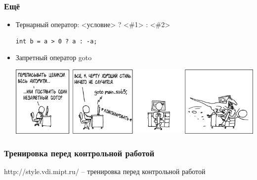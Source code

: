 \documentclass[12pt,pdf,hyperref={unicode}]{beamer}
\begin{document}
\begin{frame}[fragile]
\frametitle{Ещё} 
\begin{itemize}
\item Тернарный оператор: <условие> ? <\#1> : <\#2>\\
\begin{lstlisting}
int b = a > 0 ? a : -a;
\end{lstlisting}
\item Запретный оператор goto \\
\begin{center}
\includegraphics[width=0.99\linewidth]{images/goto.png}
\end{center}
\end{itemize}
\end{frame}



\begin{frame}[fragile]
\frametitle{Тренировка перед контрольной работой} 
http://style.vdi.mipt.ru/  -- тренировка перед контрольной работой
\end{frame}
\end{document}
